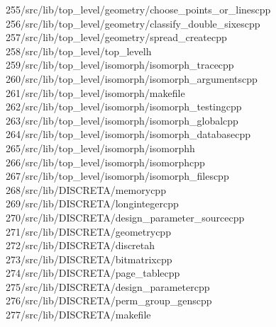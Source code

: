 \begin{tabbing}
255\>/src/lib/top\_level/geometry/choose\_points\_or\_linescpp\\[0pt]
256\>/src/lib/top\_level/geometry/classify\_double\_sixescpp\\[0pt]
257\>/src/lib/top\_level/geometry/spread\_createcpp\\[0pt]
258\>/src/lib/top\_level/top\_levelh\\[0pt]
259\>/src/lib/top\_level/isomorph/isomorph\_tracecpp\\[0pt]
260\>/src/lib/top\_level/isomorph/isomorph\_argumentscpp\\[0pt]
261\>/src/lib/top\_level/isomorph/makefile\\[0pt]
262\>/src/lib/top\_level/isomorph/isomorph\_testingcpp\\[0pt]
263\>/src/lib/top\_level/isomorph/isomorph\_globalcpp\\[0pt]
264\>/src/lib/top\_level/isomorph/isomorph\_databasecpp\\[0pt]
265\>/src/lib/top\_level/isomorph/isomorphh\\[0pt]
266\>/src/lib/top\_level/isomorph/isomorphcpp\\[0pt]
267\>/src/lib/top\_level/isomorph/isomorph\_filescpp\\[0pt]
268\>/src/lib/DISCRETA/memorycpp\\[0pt]
269\>/src/lib/DISCRETA/longintegercpp\\[0pt]
270\>/src/lib/DISCRETA/design\_parameter\_sourcecpp\\[0pt]
271\>/src/lib/DISCRETA/geometrycpp\\[0pt]
272\>/src/lib/DISCRETA/discretah\\[0pt]
273\>/src/lib/DISCRETA/bitmatrixcpp\\[0pt]
274\>/src/lib/DISCRETA/page\_tablecpp\\[0pt]
275\>/src/lib/DISCRETA/design\_parametercpp\\[0pt]
276\>/src/lib/DISCRETA/perm\_group\_genscpp\\[0pt]
277\>/src/lib/DISCRETA/makefile\\[0pt]

\end{tabbing}

